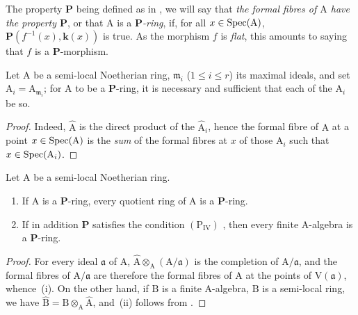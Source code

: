 
The property $\boldsymbol{P}$ being defined as in , we will say that \emph{the formal fibres of $\mathrm{A}$ have the property $\boldsymbol{P}$}, or that $\mathrm{A}$ is a \emph{$\boldsymbol{P}$-ring}, if, for all $x\in\operatorname{Spec}(\mathrm{A})$, $\boldsymbol{P}(f^{-1}(x),\boldsymbol{k}(x))$ is true.
As the morphism $f$ is \emph{flat}, this amounts to saying that $f$ is a $\boldsymbol{P}$-morphism.

\begin{proposition}[7.3.14]
\label{IV.7.3.14}
Let $\mathrm{A}$ be a semi-local Noetherian ring, $\mathfrak{m}_i$ ($1\leqslant i\leqslant r$) its maximal ideals, and set $\mathrm{A}_i=\mathrm{A}_{\mathfrak{m}_i}$; for $\mathrm{A}$ to be a $\boldsymbol{P}$-ring, it is necessary and sufficient that each of the $\mathrm{A}_i$ be so.
\end{proposition}

\begin{proof}
Indeed, $\widehat{\mathrm{A}}$ is the direct product of the $\widehat{\mathrm{A}}_i$, hence the formal fibre of $\mathrm{A}$ at a point $x\in\operatorname{Spec}(\mathrm{A})$ is the \emph{sum} of the formal fibres at $x$ of those $\mathrm{A}_i$ such that $x\in\operatorname{Spec}(\mathrm{A}_i)$.
\end{proof}

\begin{proposition}[7.3.15]
\label{IV.7.3.15}
Let $\mathrm{A}$ be a semi-local Noetherian ring.
\begin{enumerate}[label=\emph{\roman*)}]
  \item If $\mathrm{A}$ is a $\boldsymbol{P}$-ring, every quotient ring of $\mathrm{A}$ is a $\boldsymbol{P}$-ring.
  \item If in addition $\boldsymbol{P}$ satisfies the condition $(\mathrm{P_{IV}})$ , then every finite A-algebra is a $\boldsymbol{P}$-ring.
\end{enumerate}
\end{proposition}

\begin{proof}
For every ideal $\mathfrak{a}$ of $\mathrm{A}$, $\widehat{\mathrm{A}}\otimes_\mathrm{A}(\mathrm{A}/\mathfrak{a})$ is the completion of $\mathrm{A}/\mathfrak{a}$, and the formal fibres of $\mathrm{A}/\mathfrak{a}$ are therefore the formal fibres of $\mathrm{A}$ at the points of $\mathrm{V}(\mathfrak{a})$, whence~(i).
On the other hand, if $\mathrm{B}$ is a finite $\mathrm{A}$-algebra, $\mathrm{B}$ is a semi-local ring, we have $\widehat{\mathrm{B}}=\mathrm{B}\otimes_\mathrm{A}\widehat{\mathrm{A}}$, and~(ii) follows from .
\end{proof}

